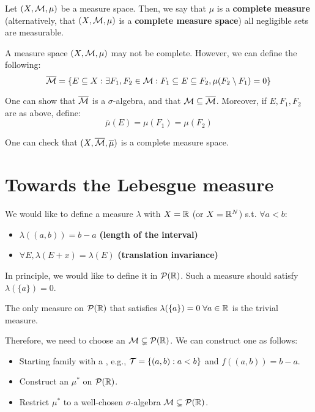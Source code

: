 \begin{fdefinition}
    Let $(X, \mathcal{M}, \mu)$ be a measure space. Then, we say that $\mu$ is a \textbf{complete measure}
    (alternatively, that $(X, \mathcal{M}, \mu)$ is a \textbf{complete measure space}) all negligible 
    sets are measurable.
\end{fdefinition}

\begin{fremark}
    A measure space $(X, \mathcal{M}, \mu)$ may not be complete. However, we can define the following:
    $$\overline{\mathcal{M}} = \{E \subseteq X: \exists F_1, F_2 \in \mathcal{M}: F_1 \subseteq E \subseteq F_2, \mu(F_2 \setminus F_1) = 0\}$$

    One can show that $\overline{\mathcal{M}}$ is a $\sigma$-algebra, and that 
    $\mathcal{M} \subseteq \overline{\mathcal{M}}$. Moreover, if $E, F_1, F_2$ are as above, define:
    $$\overline{\mu}(E) = \mu(F_1) = \mu(F_2)$$

    One can check that $(X, \overline{\mathcal{M}}, \overline{\mu})$ is a complete measure space.
\end{fremark}

\section{Towards the Lebesgue measure}

We would like to define a measure $\lambda$ with $X = \mathbb{R}$ (or $X = \mathbb{R}^N$) s.t. $\forall a < b$:
\begin{itemize}
    \item $\lambda((a, b)) = b - a$ \textbf{(length of the interval)}
    \item $\forall E, \lambda(E + x) = \lambda(E)$ \textbf{(translation invariance)}
\end{itemize}

In principle, we would like to define it in $\mathcal{P}(\mathbb{R})$. Such a measure should satisfy $\lambda(\{a\}) = 0$.

\begin{ftheorem}[Ulam]
    The only measure on $\mathcal{P}(\mathbb{R})$ that satisfies $\lambda(\{a\}) = 0 \; \forall a \in \mathbb{R}$ is
    the trivial measure.
\end{ftheorem}

\vspace{1em}

Therefore, we need to choose an $\mathcal{M} \subsetneq \mathcal{P}(\mathbb{R})$. We can construct one as follows:

\begin{itemize}
    \item Starting family with a , e.g., $\mathcal{T} = \{(a, b): a < b\}$ and $f((a, b)) = b - a$.
    \item Construct an  $\mu^*$ on $\mathcal{P}(\mathbb{R})$.
    \item Restrict $\mu^*$ to a well-chosen $\sigma$-algebra $\mathcal{M} \subsetneq \mathcal{P}(\mathbb{R})$.
\end{itemize}


